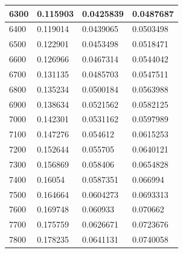 \documentclass[11pt,spanish]{article} %
\begin{document}
\begin{center}
\begin{longtable}{|l||l|l|l|}
6300                    & 0.115903                     & 0.0425839                      & 0.0487687                      \\ \hline
6400                    & 0.119014                     & 0.0439065                      & 0.0503498                      \\ \hline
6500                    & 0.122901                     & 0.0453498                      & 0.0518471                      \\ \hline
6600                    & 0.126966                     & 0.0467314                      & 0.0544042                      \\ \hline
6700                    & 0.131135                     & 0.0485703                      & 0.0547511                      \\ \hline
6800                    & 0.135234                     & 0.0500184                      & 0.0563988                      \\ \hline
6900                    & 0.138634                     & 0.0521562                      & 0.0582125                      \\ \hline
7000                    & 0.142301                     & 0.0531162                      & 0.0597989                      \\ \hline
7100                    & 0.147276                     & 0.054612                       & 0.0615253                      \\ \hline
7200                    & 0.152644                     & 0.055705                       & 0.0640121                      \\ \hline
7300                    & 0.156869                     & 0.058406                       & 0.0654828                      \\ \hline
7400                    & 0.16054                      & 0.0587351                      & 0.066994                       \\ \hline
7500                    & 0.164664                     & 0.0604273                      & 0.0693313                      \\ \hline
7600                    & 0.169748                     & 0.060933                       & 0.070662                       \\ \hline
7700                    & 0.175759                     & 0.0626671                      & 0.0723676                      \\ \hline
7800                    & 0.178235                     & 0.0641131                      & 0.0740058                      \\ \hline

\end{longtable}
\end{center}
\end{document}
